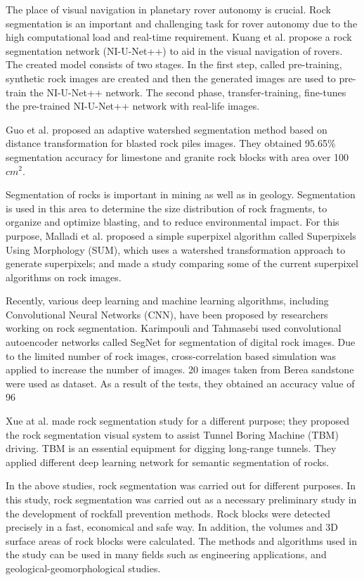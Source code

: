 \documentclass[a4paper,fleqn]{cas-sc}
\begin{document}
The place of visual navigation in planetary rover autonomy is crucial. Rock segmentation is an important and challenging task for rover autonomy due to the high computational load and real-time requirement. Kuang et al. \citep{kuang2021rock} propose a rock segmentation network (NI-U-Net++) to aid in the visual navigation of rovers. The created model consists of two stages. In the first step, called pre-training, synthetic rock images are created and then the generated images are used to pre-train the NI-U-Net++ network. The second phase, transfer-training, fine-tunes the pre-trained NI-U-Net++ network with real-life images.

Guo et al. \citep{guo2022method} proposed an adaptive watershed segmentation method based on distance transformation for blasted rock piles images. They obtained 95.65\% segmentation accuracy for limestone and granite rock blocks with area over 100 $cm^2$. 

Segmentation of rocks is important in mining as well as in geology. Segmentation is used in this area to determine the size distribution of rock fragments, to organize and optimize blasting, and to reduce environmental impact. For this purpose, Malladi et al. \citep{malladi2014superpixels} proposed a simple superpixel algorithm called Superpixels Using Morphology (SUM), which uses a watershed transformation approach to generate superpixels; and made a study comparing some of the current superpixel algorithms on rock images.

Recently, various deep learning and machine learning algorithms, including Convolutional Neural Networks (CNN), have been proposed by researchers working on rock segmentation. Karimpouli and Tahmasebi \citep{karimpouli2019segmentation} used convolutional autoencoder networks called SegNet for segmentation of digital rock images. Due to the limited number of rock images, cross-correlation based simulation was applied to increase the number of images. 20 images taken from Berea sandstone were used as dataset. As a result of the tests, they obtained an accuracy value of 96%

Xue at al. \citep{xue2021rock} made rock segmentation study for a different purpose; they proposed the rock segmentation visual system to assist Tunnel Boring Machine (TBM) driving. TBM is an essential equipment for digging long-range tunnels. They applied different deep learning network for semantic segmentation of rocks.

In the above studies, rock segmentation was carried out for different purposes. In this study, rock segmentation was carried out as a necessary preliminary study in the development of rockfall prevention methods. Rock blocks were detected precisely in a fast, economical and safe way. In addition, the volumes and 3D surface areas of rock blocks were calculated. The methods and algorithms used in the study can be used in many fields such as engineering applications, and geological-geomorphological studies.
\end{document}
